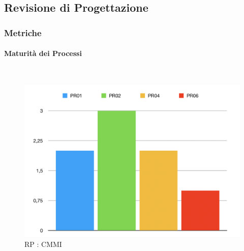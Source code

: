 \newpage

\subsection{Revisione di Progettazione}
\label{PR}
\subsubsection{Metriche}

\paragraph{Maturità dei Processi} \-\\

\begin{figure}[H]
	\begin{center}
		\includegraphics[scale=0.4]{./images/grafici_RP/CMMI.png} 
	\end{center}
	\caption{RP : CMMI}
\end{figure}

